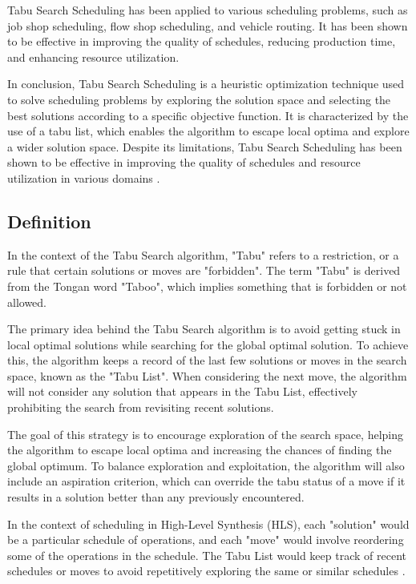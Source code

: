 \documentclass[conference]{IEEEtran}
\begin{document}
Tabu Search Scheduling has been applied to various scheduling problems, such as job shop scheduling, flow shop scheduling, and vehicle routing. It has been shown to be effective in improving the quality of schedules, reducing production time, and enhancing resource utilization.

In conclusion, Tabu Search Scheduling is a heuristic optimization technique used to solve scheduling problems by exploring the solution space and selecting the best solutions according to a specific objective function. It is characterized by the use of a tabu list, which enables the algorithm to escape local optima and explore a wider solution space. Despite its limitations, Tabu Search Scheduling has been shown to be effective in improving the quality of schedules and resource utilization in various domains \cite{glover1995genetic}.

\subsection{Definition}
In the context of the Tabu Search algorithm, "Tabu" refers to a restriction, or a rule that certain solutions or moves are "forbidden". The term "Tabu" is derived from the Tongan word "Taboo", which implies something that is forbidden or not allowed.

The primary idea behind the Tabu Search algorithm is to avoid getting stuck in local optimal solutions while searching for the global optimal solution. To achieve this, the algorithm keeps a record of the last few solutions or moves in the search space, known as the "Tabu List". When considering the next move, the algorithm will not consider any solution that appears in the Tabu List, effectively prohibiting the search from revisiting recent solutions.

The goal of this strategy is to encourage exploration of the search space, helping the algorithm to escape local optima and increasing the chances of finding the global optimum. To balance exploration and exploitation, the algorithm will also include an aspiration criterion, which can override the tabu status of a move if it results in a solution better than any previously encountered.

In the context of scheduling in High-Level Synthesis (HLS), each "solution" would be a particular schedule of operations, and each "move" would involve reordering some of the operations in the schedule. The Tabu List would keep track of recent schedules or moves to avoid repetitively exploring the same or similar schedules \cite{hanafi2001convergence}.
\end{document}

